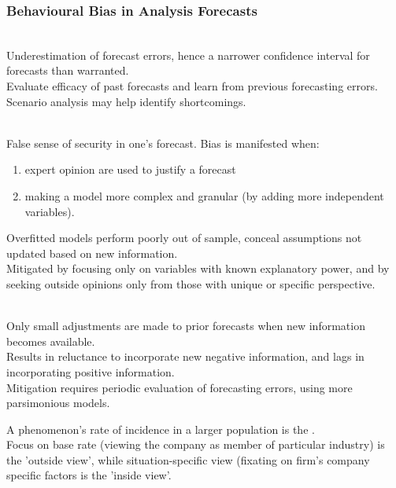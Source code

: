 \subsubsection{Behavioural Bias in Analysis Forecasts}

\begin{remark} \\
Underestimation of forecast errors, hence a narrower confidence interval for forecasts than warranted.\\
Evaluate efficacy of past forecasts and learn from previous forecasting errors.\\
Scenario analysis may help identify shortcomings.
\end{remark}

\begin{remark} \\
False sense of security in one's forecast. Bias is manifested when:
\begin{enumerate}[label=\roman*.]
\setlength{\itemsep}{0pt}
\item expert opinion are used to justify a forecast
\item making a model more complex and granular (by adding more independent variables).
\end{enumerate}
Overfitted models perform poorly out of sample, conceal assumptions not updated based on new information.\\
Mitigated by focusing only on variables with known explanatory power, and by seeking outside opinions only from those with unique or specific perspective.
\end{remark}

\begin{remark} \\
Only small adjustments are made to prior forecasts when new information becomes available.\\
Results in reluctance to incorporate new negative information, and lags in incorporating positive information.\\
Mitigation requires periodic evaluation of forecasting errors, using more parsimonious models.
\end{remark}

\begin{definition}
A phenomenon's rate of incidence in a larger population is the .\\
Focus on base rate (viewing the company as member of particular industry) is the 'outside view', while situation-specific view (fixating on firm's company specific factors is the 'inside view'.
\end{definition}

